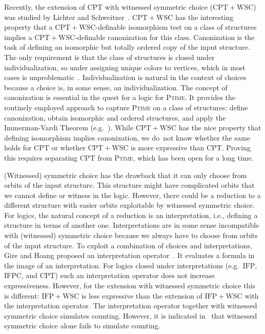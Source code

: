 \documentclass[]{lmcs}
\newcommand{\PTime}{\textsc{Ptime}}
\newcommand{\CPT}{\ensuremath{\mathrm{CPT}}}
\newcommand{\CPTWSC}{\ensuremath{\mathrm{CPT{+}WSC}}}
\newcommand{\IFP}{\ensuremath{\mathrm{IFP}}}
\newcommand{\IFPWSC}{\ensuremath{\mathrm{IFP{+}WSC}}}
\newcommand{\IFPC}{\ensuremath{\mathrm{IFPC}}}
\begin{document}
Recently, the extension of \CPT{} with witnessed symmetric choice (\CPTWSC{}) was studied by Lichter and Schweitzer~\cite{LichterSchweitzer24}.
\CPTWSC{} has the interesting property
that a \CPTWSC{}-definable isomorphism test on a class of structures implies a \CPTWSC{}-definable canonization for this class.
Canonization is the task of defining an isomorphic but totally ordered copy of the input structure.
The only requirement is that the class of structures is closed under individualization, so under assigning unique colors to vertices,
which in most cases is unproblematic~\cite{DBLP:conf/mfcs/KieferSS15, DBLP:journals/ipl/Mathon79}.
Individualization is natural in the context of choices because
a choice is, in some sense, an individualization.
The concept of canonization is essential in the quest for a logic for \PTime{}.
It provides the routinely employed approach to capture \PTime{} on a class of structures:
define canonization, obtain isomorphic and ordered structures, and apply the Immerman-Vardi Theorem (e.g.~\cite{AbuZaidGraedelGrohePakusa2014, Grohe2017, GroheN19, LichterS21}).
While \CPTWSC{} has the nice property that defining isomorphism implies canonization,
we do~not know whether the same holds for \CPT{}
or whether \CPTWSC{} is more expressive than \CPT{}.
Proving this requires separating \CPT{} from \PTime{},
which has been open for a long time.

(Witnessed) symmetric choice has the drawback that it can only choose from orbits
of the input structure.
This structure might have complicated orbits
that we cannot define or witness in the logic.
However, there could be a reduction to a different structure with easier orbits exploitable by witnessed symmetric choice.
For logics, the natural concept of a reduction is an interpretation,
i.e., defining a structure in terms of another one.
Interpretations are in some sense incompatible
with (witnessed) symmetric choice
because we always have to choose from orbits of the input structure.
To exploit a combination of choices and interpretations,
Gire and Hoang proposed an interpretation operator~\cite{GireHoang98}.
It evaluates a formula in the image of an interpretation.
For logics closed under interpretations (e.g.~\IFP{}, \IFPC{}, and \CPT{})
such an interpretation operator does not increase expressiveness.
However, for the extension with witnessed symmetric choice this is different:
\IFPWSC{} is less expressive than the extension of \IFPWSC{} with the interpretation operator.
The interpretation operator together with witnessed symmetric choice 
simulates counting.
However, it is indicated in~\cite{GireHoang98} that witnessed symmetric choice alone fails to simulate counting.
\end{document}
